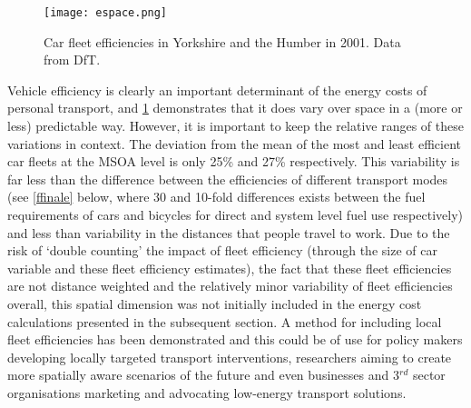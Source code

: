 \begin{figure}[htbp]
  \centerline{
    \texttt{[image: espace.png]}}
  \caption[Car fleet efficiencies in Yorkshire and the Humber in 2001]{Car fleet
efficiencies in Yorkshire and the Humber in 2001. Data from DfT.
}
  \label{fig:espace}
\end{figure}

Vehicle efficiency is clearly an important determinant of the energy costs of
personal transport, and \cref{fig:espace} demonstrates that it does vary over space in a
(more or less) predictable way. However, it is important to keep the relative
ranges of these variations in context. The deviation from the mean of the most
and least efficient car fleets at the MSOA level is only 25\% and 27\% respectively. This
variability is far less than the difference between the efficiencies of
different transport modes (see \cref{ffinale} below,
where 30 and 10-fold differences exists between the
fuel requirements of cars and bicycles for direct and system level fuel use
respectively) and less than variability in the distances that people travel
to work. Due to the risk of `double counting' the impact of fleet efficiency
(through the size of car variable and these fleet efficiency estimates),
the fact that these fleet efficiencies are not distance weighted and
the relatively minor variability of fleet efficiencies overall,
this spatial dimension was not initially included in the energy cost
calculations presented in the subsequent section.
A method for including local fleet efficiencies has been demonstrated
and this could be of use for policy makers developing locally targeted
transport interventions, researchers aiming to create more
spatially aware scenarios of the future and even businesses and 
3$^{rd}$ sector organisations marketing and advocating low-energy
transport solutions. %


